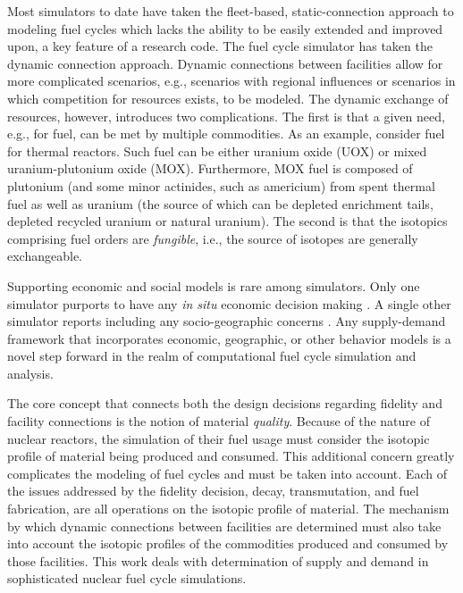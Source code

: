 Most simulators to date have taken the fleet-based, static-connection approach
to modeling fuel cycles which lacks the ability to be easily extended and
improved upon, a key feature of a research code. The \Cyclus fuel cycle
simulator has taken the dynamic connection approach. Dynamic connections between
facilities allow for more complicated scenarios, e.g., scenarios with regional
influences or scenarios in which competition for resources exists, to be
modeled. The dynamic exchange of resources, however, introduces two
complications. The first is that a given need, e.g., for fuel, can be met by
multiple commodities. As an example, consider fuel for thermal reactors. Such
fuel can be either uranium oxide (UOX) or mixed uranium-plutonium oxide
(MOX). Furthermore, MOX fuel is composed of plutonium (and some minor actinides,
such as americium) from spent thermal fuel as well as uranium (the source of
which can be depleted enrichment tails, depleted recycled uranium or natural
uranium). The second is that the isotopics comprising fuel orders are
\textit{fungible}, i.e., the source of isotopes are generally exchangeable.

Supporting economic and social models is rare among simulators. Only one
simulator purports to have any \textit{in situ} economic decision making
\cite{van_den_durpel_daness_2009}. A single other simulator reports including
any socio-geographic concerns \cite{andrianova_desae_2008}. Any supply-demand
framework that incorporates economic, geographic, or other behavior models is a
novel step forward in the realm of computational fuel cycle simulation and
analysis.

The core concept that connects both the design decisions regarding fidelity and
facility connections is the notion of material \textit{quality}. Because of the
nature of nuclear reactors, the simulation of their fuel usage must consider the
isotopic profile of material being produced and consumed. This additional
concern greatly complicates the modeling of fuel cycles and must be taken into
account. Each of the issues addressed by the fidelity decision, decay,
transmutation, and fuel fabrication, are all operations on the isotopic profile
of material. The mechanism by which dynamic connections between facilities are
determined must also take into account the isotopic profiles of the commodities
produced and consumed by those facilities. This work deals with determination of
supply and demand in sophisticated nuclear fuel cycle simulations.
